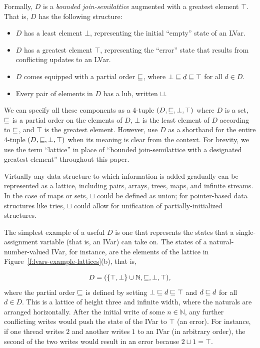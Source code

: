 Formally, $D$ is a \emph{bounded join-semilattice} augmented with a
greatest element $\top$.  That is, $D$ has the following structure:
\begin{itemize}
\item $D$ has a least element $\bot$, representing the initial
  ``empty'' state of an LVar.
\item $D$ has a greatest element $\top$, representing the ``error''
  state that results from conflicting updates to an LVar.
\item $D$ comes equipped with a partial order $\sqsubseteq$, where $\bot
  \sqsubseteq d \sqsubseteq \top$ for all $d \in D$.
\item Every pair of elements in $D$ has a lub, written $\sqcup$.
\end{itemize}
We can specify all these components as a 4-tuple $(D, \sqsubseteq, \bot,
\top)$ where $D$ is a set, $\sqsubseteq$ is a partial order on the
elements of $D$, $\bot$ is the least element of $D$ according to
$\sqsubseteq$, and $\top$ is the greatest element.  However,  use $D$ as a
shorthand for the entire 4-tuple $(D, \sqsubseteq, \bot, \top)$ when its
meaning is clear from the context.
\ifdefined\JOURNAL
For brevity, we use the term ``lattice'' in place of ``bounded
join-semilattice with a designated greatest element'' throughout this
paper.
\fi

Virtually any data structure to which information is added gradually
can be represented as a lattice, including pairs, arrays, trees, maps,
and infinite streams.  In the case of maps or sets, $\sqcup$ could be
defined as union; for pointer-based data structures like tries, $\sqcup$
could allow for unification of partially-initialized structures.

The simplest example of a useful $D$ is one that represents the
states that a single-assignment variable (that is, an IVar) can take
on.  The states of a natural-number-valued IVar, for instance, are the elements of
the lattice in
Figure~\ref{f:lvars-example-lattices}(b), that is,

\vspace{-8mm}
\singlespacing
\begin{displaymath}
  D = (\lbrace \top, \bot \rbrace \cup \mathbb{N}, \sqsubseteq, \bot, \top), 
\end{displaymath}
\doublespacing
%
where the partial order $\sqsubseteq$ is defined by setting $\bot
\sqsubseteq d \sqsubseteq \top$ and $d \sqsubseteq d$ for all $d \in D$.  This
is a lattice of height three and infinite width, where the naturals
are arranged horizontally.  After the initial write of some $n \in
\mathbb{N}$, any further conflicting writes would push the state of
the IVar to $\top$ (an error).  For instance, if one thread writes $2$
and another writes $1$ to an IVar (in arbitrary order), the second of
the two writes would result in an error because $2 \sqcup 1 = \top$.

